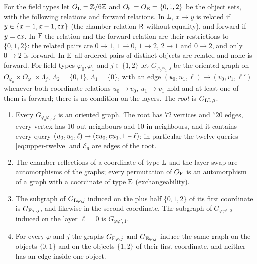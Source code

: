 For the field types let $O_{\rm L}=\mathbb Z/6\mathbb Z$ and $O_{\rm F}=O_{\rm E}=\{0,1,2\}$ be
the object sets, with the following relations and forward relations. In
$\rm L$, $x\to y$ is related if $y\in\{x+1,x-1,\mathsf c x\}$ (the chamber relation
$\mathsf R$ without equality), and forward if $y=\mathsf c x$. In $\rm F$ the relation and
the forward relation are their restrictions to $\{0,1,2\}$: the related pairs are
$0\to1$, $1\to0$, $1\to2$, $2\to1$ and $0\to2$, and only $0\to2$ is forward. In
$\rm E$ all ordered pairs of distinct objects are related and none is forward.
For field types $\varphi_0,\varphi_1$ and $j\in\{1,2\}$ let
$G_{\varphi_0\varphi_1,j}$ be the oriented graph on
$O_{\varphi_0}\times O_{\varphi_1}\times\Lambda_j$, $\Lambda_2=\{0,1\}$,
$\Lambda_1=\{0\}$, with an edge $(u_0,u_1,\ell)\to(v_0,v_1,\ell')$ whenever both
coordinate relations $u_0\to v_0$, $u_1\to v_1$ hold and at least one of them is
forward; there is no condition on the layers. The \emph{root} is $G_{\rm LL,2}$.

\begin{lemma}\label{lem:upper-geometry}
\leavevmode
\begin{enumerate}[label=(\alph*)]
\item Every $G_{\varphi_0\varphi_1,j}$ is an oriented graph. The root has $72$
 vertices and $720$ edges, every vertex has $10$ out-neighbours and $10$
 in-neighbours, and it contains every query
 $(u_0,u_1,\ell)\to(\mathsf c u_0,\mathsf c u_1,1-\ell)$; in particular the twelve queries
 \eqref{eq:upper-twelve} and $\mathcal E_6$ are edges of the root.
\item The chamber reflections of a coordinate of type $\rm L$ and the layer swap
 are automorphisms of the graphs; every permutation of $O_{\rm E}$ is an
 automorphism of a graph with a coordinate of type $\rm E$ (exchangeability).
\item The subgraph of $G_{{\rm L}\varphi,j}$ induced on the plus half
 $\{0,1,2\}$ of its first coordinate is $G_{{\rm F}\varphi,j}$, and likewise in
 the second coordinate. The subgraph of $G_{\varphi\varphi',2}$ induced on the
 layer $\ell=0$ is $G_{\varphi\varphi',1}$.
\item For every $\varphi$ and $j$ the graphs $G_{{\rm F}\varphi,j}$ and
 $G_{{\rm E}\varphi,j}$ induce the same graph on the objects $\{0,1\}$ and on the
 objects $\{1,2\}$ of their first coordinate, and neither has an edge inside one
 object.
\end{enumerate}
\end{lemma}

